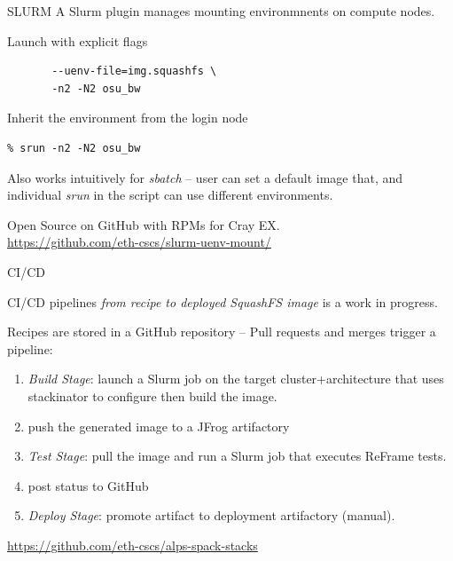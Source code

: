 \documentclass[aspectratio=43]{beamer}
\begin{document}
\begin{frame}[fragile]{SLURM}
    A Slurm plugin manages mounting environmnents on compute nodes.
    \begin{code}{Launch with explicit flags}
            \begin{lstlisting}[style=talkbash]
% srun --uenv-mount=/user-environment \
       --uenv-file=img.squashfs \
       -n2 -N2 osu_bw
            \end{lstlisting}
    \end{code}
    \begin{code}{Inherit the environment from the login node}
            \begin{lstlisting}[style=talkbash]
% squashfs-mount img.squashfs /user-environment bash
% srun -n2 -N2 osu_bw
            \end{lstlisting}
    \end{code}

    Also works intuitively for \emph{sbatch} -- user can set a default image that, and individual \emph{srun} in the script can use different environments.

    Open Source on GitHub with RPMs for Cray EX.\\\url{https://github.com/eth-cscs/slurm-uenv-mount/}
\end{frame}

\begin{frame}[fragile]{CI/CD}
    \begin{center}
    CI/CD pipelines \emph{from recipe to deployed SquashFS image} is a work in progress.
    \end{center}

    \vspace{10pt}

    Recipes are stored in a GitHub repository -- Pull requests and merges trigger a pipeline:
    \begin{enumerate}
        \item \emph{\sc Build Stage}: launch a Slurm job on the target cluster+architecture that uses stackinator to configure then build the image.
        \item push the generated image to a JFrog artifactory
        \item \emph{\sc Test Stage}: pull the image and run a Slurm job that executes ReFrame tests.
        \item post status to GitHub
        \item \emph{\sc Deploy Stage}: promote artifact to deployment artifactory (manual).
    \end{enumerate}

    \url{https://github.com/eth-cscs/alps-spack-stacks}
\end{frame}
\end{document}

